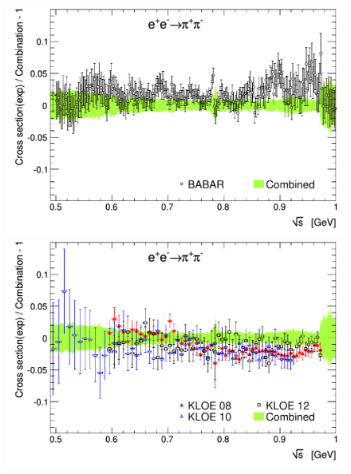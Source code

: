 \begin{figure}[p]
\begin{center}
\includegraphics[width=\figsize]{Figures/diffRel_channel_ePeM_to_piPpiM_babar_dhmz19.pdf}\hspace{\fighspace}
\includegraphics[width=\figsize]{Figures/diffRel_channel_ePeM_to_piPpiM_kloe_dhmz19.pdf}
\vspace{0.2cm}


\end{center}
\end{figure}
